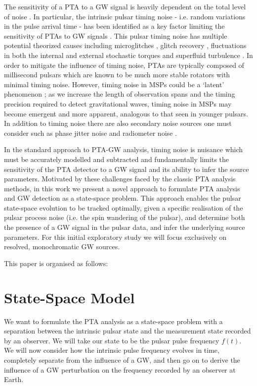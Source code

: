 \documentclass[fleqn,usenatbib,useAMS]{mnras}
\begin{document}
\noindent The sensitivity of a PTA to a GW signal is heavily dependent on the total level of noise \citep{Wang2015}. In particular, the intrinsic pulsar timing noise - i.e.  random variations in the pulse arrival time - has been identified as a key factor limiting the sensitivity of PTAs to GW signals \citep{Shannon2010,Lasky2015,Caballero2016}. This pulsar timing noise has multiple potential theorized causes including microglitches \citep{Melatos2008}, glitch recovery \citep{Hobbs2010glitch}, fluctuations in both the internal and external stochastic torques \citep{Antonelli2023} and superfluid turbulence \citep{Melatos2014}. In order to mitigate the influence of timing noise, PTAs are typically composed of millisecond pulsars which are known to be much more stable rotators with minimal timing noise. However, 
timing noise in MSPs could be a `latent' phenomenon \citep{Shannon2010}; as we increase the length of observation spans and the timing precision required to detect gravitational waves, timing noise in MSPs may become emergent and more apparent, analogous to that seen in younger pulsars. In addition to timing noise there are also secondary noise sources one must consider such as phase jitter noise and radiometer noise \citep{Cordes2010,Lam2019,Parthasarathy2021}. \newline 


\noindent In the standard approach to PTA-GW analysis, timing noise is nuisance which must be accurately modelled and subtracted and fundamentally limits the sensitivity of the PTA detector to a GW signal and its ability to infer the source parameters. Motivated by these challenges faced by the classic PTA analysis methods, in this work we present a novel approach to formulate PTA analysis and GW detection as a state-space problem. This approach enables the pulsar state-space evolution to be tracked optimally, given a specific realisation of the pulsar process noise (i.e. the spin wandering of the pulsar), and determine both the presence of a GW signal in the pulsar data, and  infer the underlying source parameters. For this initial exploratory study we will focus exclusively on resolved, monochromatic GW sources. \newline 


This paper is organised as follows:








\section{State-Space Model}
We want to formulate the PTA analysis as a state-space problem with a separation between the intrinsic pulsar state and the measurement state recorded by an observer. We will take our state to be the pulsar pulse frequency $f(t)$. We will now consider how the intrinsic pulse frequency evolves in time, completely separate from the influence of a GW, and then go on to derive the  influence of a GW perturbation on the frequency recorded by an observer at Earth.
\end{document}
